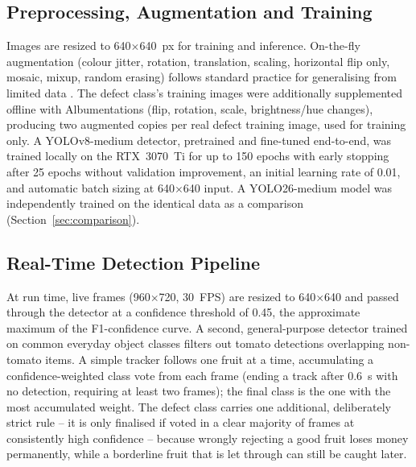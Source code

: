 \documentclass[journal]{IEEEtran}
\begin{document}
\subsection{Preprocessing, Augmentation and Training}
Images are resized to 640$\times$640~px for training and inference. On-the-fly augmentation (colour jitter, rotation, translation, scaling, horizontal flip only, mosaic, mixup, random erasing) follows standard practice for generalising from limited data \cite{shorten2019}. The defect class's training images were additionally supplemented offline with Albumentations \cite{buslaev2020} (flip, rotation, scale, brightness/hue changes), producing two augmented copies per real defect training image, used for training only. A YOLOv8-medium detector, pretrained and fine-tuned end-to-end, was trained locally on the RTX~3070~Ti for up to 150 epochs with early stopping after 25 epochs without validation improvement, an initial learning rate of 0.01, and automatic batch sizing at 640$\times$640 input. A YOLO26-medium model was independently trained on the identical data as a comparison (Section~\ref{sec:comparison}).

\subsection{Real-Time Detection Pipeline}
At run time, live frames (960$\times$720, 30~FPS) are resized to 640$\times$640 and passed through the detector at a confidence threshold of 0.45, the approximate maximum of the F1-confidence curve. A second, general-purpose detector trained on common everyday object classes filters out tomato detections overlapping non-tomato items. A simple tracker follows one fruit at a time, accumulating a confidence-weighted class vote from each frame (ending a track after 0.6~s with no detection, requiring at least two frames); the final class is the one with the most accumulated weight. The defect class carries one additional, deliberately strict rule -- it is only finalised if voted in a clear majority of frames at consistently high confidence -- because wrongly rejecting a good fruit loses money permanently, while a borderline fruit that is let through can still be caught later.
\end{document}
